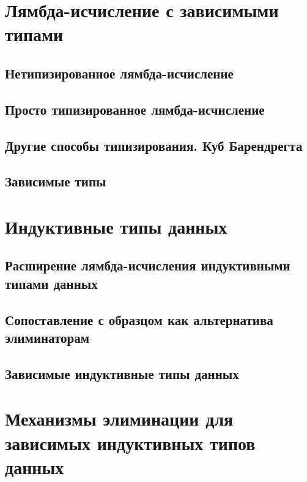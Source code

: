 \section{Лямбда-исчисление с зависимыми типами}

\subsection{Нетипизированное лямбда-исчисление}

\subsection{Просто типизированное лямбда-исчисление}

\subsection{Другие способы типизирования. Куб Барендрегта}

\subsection{Зависимые типы}

\section{Индуктивные типы данных}

\subsection{Расширение лямбда-исчисления индуктивными типами данных}

\subsection{Сопоставление с образцом как альтернатива элиминаторам}

\subsection{Зависимые индуктивные типы данных}

\section{Механизмы элиминации для зависимых индуктивных типов данных}
